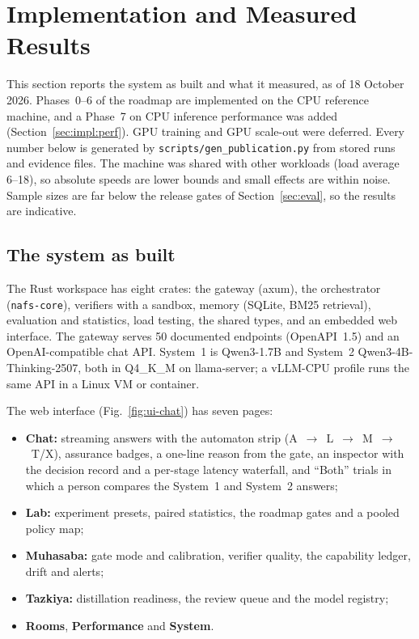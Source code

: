 \section{Implementation and Measured Results}
\label{sec:impl}
This section reports the system as built and what it measured, as of 18 October 2026. Phases~0--6 of the
roadmap are implemented on the CPU reference machine, and a Phase~7 on CPU inference performance was added
(Section~\ref{sec:impl:perf}). GPU training and GPU scale-out were deferred. Every number below is generated by
\texttt{scripts/gen\_publication.py} from stored runs and evidence files. The machine was shared with other
workloads (load average 6--18), so absolute speeds are lower bounds and small effects are within noise. Sample
sizes are far below the release gates of Section~\ref{sec:eval}, so the results are indicative.

\subsection{The system as built}
The Rust workspace has eight crates: the gateway (axum), the orchestrator (\texttt{nafs-core}), verifiers with
a sandbox, memory (SQLite, BM25 retrieval), evaluation and statistics, load testing, the shared types, and an
embedded web interface. The gateway serves 50 documented endpoints (OpenAPI~1.5) and an OpenAI-compatible chat
API. System~1 is Qwen3-1.7B and System~2 Qwen3-4B-Thinking-2507, both in Q4\_K\_M on llama-server; a vLLM-CPU
profile runs the same API in a Linux VM or container.

The web interface (Fig.~\ref{fig:ui-chat}) has seven pages:
\begin{itemize}
\item \textbf{Chat:} streaming answers with the automaton strip (A~$\to$~L~$\to$~M~$\to$~T/X), assurance badges,
a one-line reason from the gate, an inspector with the decision record and a per-stage latency waterfall, and
``Both'' trials in which a person compares the System~1 and System~2 answers;
\item \textbf{Lab:} experiment presets, paired statistics, the roadmap gates and a pooled policy map;
\item \textbf{Muhasaba:} gate mode and calibration, verifier quality, the capability ledger, drift and alerts;
\item \textbf{Tazkiya:} distillation readiness, the review queue and the model registry;
\item \textbf{Rooms}, \textbf{Performance} and \textbf{System}.
\end{itemize}

